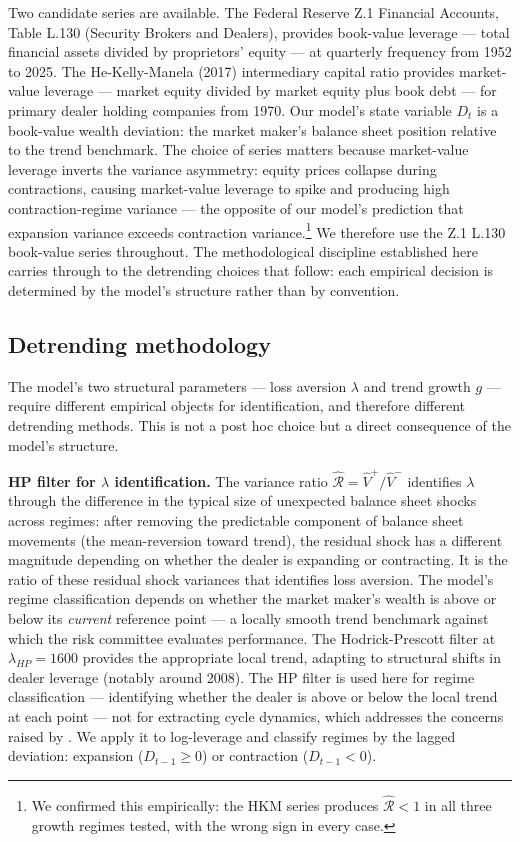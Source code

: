 \documentclass[12pt,a4paper]{article}
\theoremstyle{definition}
\begin{document}
Two candidate series are available. The Federal Reserve Z.1 Financial
Accounts, Table L.130 (Security Brokers and Dealers), provides
book-value leverage --- total financial assets divided by proprietors'
equity --- at quarterly frequency from 1952 to 2025. The He-Kelly-Manela
(2017) intermediary capital ratio provides market-value leverage ---
market equity divided by market equity plus book debt --- for primary
dealer holding companies from 1970. Our model's state variable $D_t$ is
a book-value wealth deviation: the market maker's balance sheet position
relative to the trend benchmark. The choice of series matters because
market-value leverage inverts the variance asymmetry: equity prices
collapse during contractions, causing market-value leverage to spike and
producing high contraction-regime variance --- the opposite of our
model's prediction that expansion variance exceeds contraction
variance.\footnote{We confirmed this empirically: the HKM series
produces $\hat{\mathcal{R}} < 1$ in all three growth regimes tested,
with the wrong sign in every case.}
We therefore use the Z.1 L.130 book-value series throughout. The
methodological discipline established here carries through to the
detrending choices that follow: each empirical decision is determined by
the model's structure rather than by convention.

\subsection{Detrending methodology}
\label{sec:detrending}

The model's two structural parameters --- loss aversion $\lambda$ and
trend growth $g$ --- require different empirical objects for
identification, and therefore different detrending methods. This is not
a post hoc choice but a direct consequence of the model's structure.

\noindent\textbf{HP filter for $\lambda$ identification.} The variance
ratio $\hat{\mathcal{R}} = \hat{V}^+/\hat{V}^-$ identifies $\lambda$
through the difference in the typical size of unexpected balance sheet
shocks across regimes: after removing the predictable component of
balance sheet movements (the mean-reversion toward trend), the residual
shock has a different magnitude depending on whether the dealer is
expanding or contracting. It is the ratio of these residual shock
variances that identifies loss aversion. The model's regime
classification depends on whether the market maker's wealth is above or
below its \emph{current} reference point --- a locally smooth trend
benchmark against which the risk committee evaluates performance. The
Hodrick-Prescott filter \citep{hodrick1997} at $\lambda_{HP} = 1600$
\citep{ravn2002} provides the appropriate local trend, adapting to
structural shifts in dealer leverage (notably around 2008). The HP
filter is used here for regime classification --- identifying whether
the dealer is above or below the local trend at each point --- not for
extracting cycle dynamics, which addresses the concerns raised by
\citet{hamilton2018}. We apply it to log-leverage and classify
regimes by the lagged deviation: expansion ($D_{t-1} \geq 0$) or
contraction ($D_{t-1} < 0$).
\end{document}
